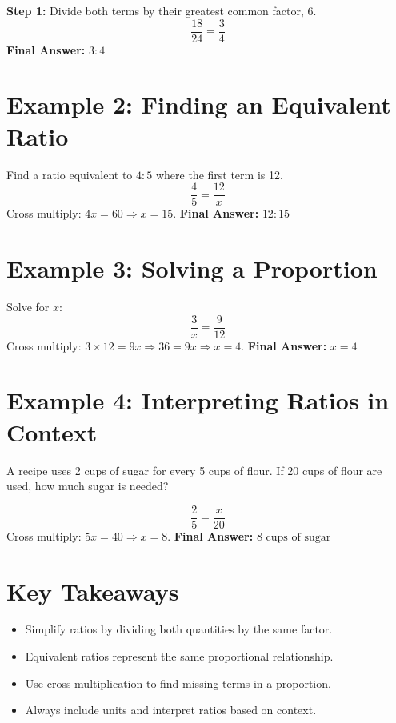 \documentclass[12pt]{article}
\begin{document}
\textbf{Step 1:} Divide both terms by their greatest common factor, 6.  
\[
\frac{18}{24} = \frac{3}{4}
\]
\textbf{Final Answer:} \(\boxed{3:4}\)

\section*{Example 2: Finding an Equivalent Ratio}

Find a ratio equivalent to \(4:5\) where the first term is 12.  
\[
\frac{4}{5} = \frac{12}{x}
\]
Cross multiply: \(4x = 60 \Rightarrow x = 15.\)  
\textbf{Final Answer:} \(\boxed{12:15}\)

\section*{Example 3: Solving a Proportion}

Solve for \(x\):
\[
\frac{3}{x} = \frac{9}{12}
\]
Cross multiply: \(3 \times 12 = 9x \Rightarrow 36 = 9x \Rightarrow x = 4.\)  
\textbf{Final Answer:} \(\boxed{x = 4}\)

\section*{Example 4: Interpreting Ratios in Context}

A recipe uses 2 cups of sugar for every 5 cups of flour. If 20 cups of flour are used, how much sugar is needed?

\[
\frac{2}{5} = \frac{x}{20}
\]
Cross multiply: \(5x = 40 \Rightarrow x = 8.\)  
\textbf{Final Answer:} \(\boxed{8\text{ cups of sugar}}\)

\section*{Key Takeaways}
\begin{itemize}
    \item Simplify ratios by dividing both quantities by the same factor.
    \item Equivalent ratios represent the same proportional relationship.
    \item Use cross multiplication to find missing terms in a proportion.
    \item Always include units and interpret ratios based on context.
\end{itemize}

\newpage

\end{document}
